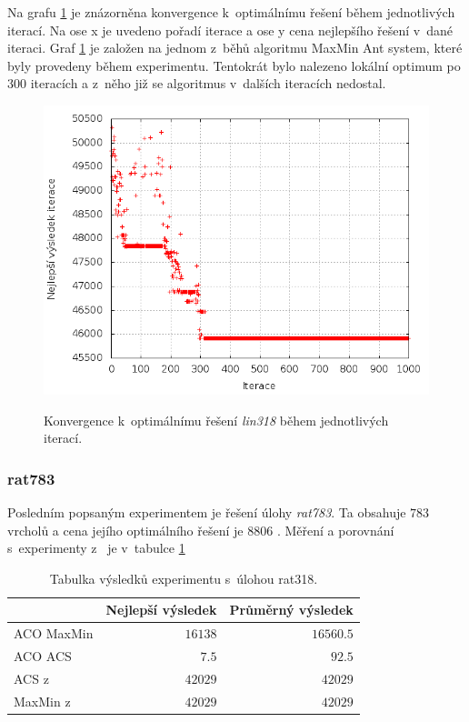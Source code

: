 \documentclass[a4paper, 12pt]{article}
\begin{document}
Na grafu \ref{fig:best_lin} je znázorněna konvergence k~optimálnímu řešení během jednotlivých iterací. Na ose x je uvedeno pořadí iterace a ose y
cena nejlepšího řešení v~dané iteraci. Graf \ref{fig:best_lin} je založen na jednom z~běhů algoritmu MaxMin Ant system, které byly provedeny během experimentu.
Tentokrát bylo nalezeno lokální optimum po 300 iteracích a z~něho již se algoritmus v~dalších iteracích nedostal.
\begin{figure}[bt]
\begin{center}
\scalebox{0.6}
{
  \includegraphics{imgs/best_lin.png}
}
\caption{
Konvergence k~optimálnímu řešení \emph{lin318} během jednotlivých iterací.}
\label{fig:best_lin}
\end{center}
\end{figure}

\subsubsection{rat783}
Posledním popsaným experimentem je řešení úlohy \emph{rat783}. Ta obsahuje $783$ vrcholů a cena jejího optimálního řešení je $8 806$ \cite{aco:acs}. 
Měření a porovnání s~experimenty z~\cite{aco:maxmintsp,aco:acs} je v~tabulce \ref{rat783}
\begin{table}[tb]
\begin{center}
  \begin{tabular}{ | l | r | r |}
   \hline
    & \textbf{Nejlepší výsledek} & \textbf{Průměrný výsledek} \\ \hline \hline
    ACO MaxMin & $16138$ & $16560.5$ \\ \hline
    ACO ACS & $7.5$ & $92.5$ \\ \hline
    ACS z~\cite{aco:acs} & $42 029$ & $42 029$ \\ \hline
    MaxMin z~\cite{aco:maxmintsp} & $42 029$ & $42 029$\\ \hline
   \end{tabular}
   \caption{Tabulka výsledků experimentu s~úlohou rat318.}
   \label{rat783}
\end{center}
\end{table}
\end{document}
